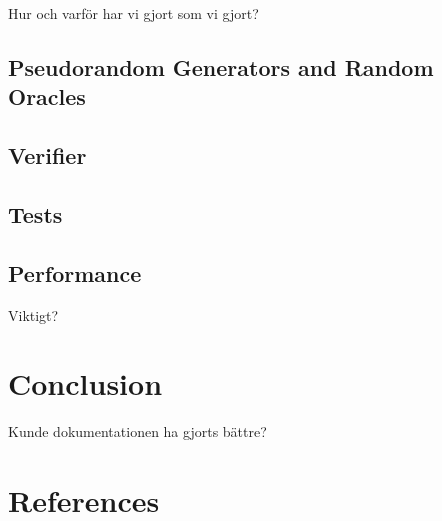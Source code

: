 \documentclass[10pt,a4paper]{article}
\begin{document}
Hur och varför har vi gjort som vi gjort?

\subsection{Pseudorandom Generators and Random Oracles}

\subsection{Verifier}

\subsection{Tests}

\subsection{Performance}

Viktigt?

\section{Conclusion}
Kunde dokumentationen ha gjorts bättre?


\section{References}
\end{document}
